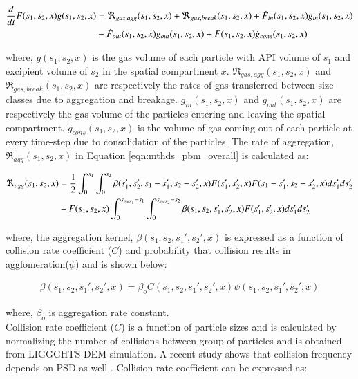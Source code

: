 \documentclass[preprint,11pt,authoryear]{elsarticle}
\begin{document}
\begin{align}
\frac{d}{dt}F(s_1,s_2,x)g(s_1,s_2,x)&= 
\Re_{gas,agg}(s_1,s_2,x)+\Re_{gas,break}(s_1,s_2,x)+\dot{F}_{in}(s_1,s_2,x)g_{in}(s_1,s_2,x)\notag\\
&-\dot{F}_{out}(s_1,s_2,x)g_{out}(s_1,s_2,x)+F(s_1,s_2,x)\dot{g}_{cons}(s_1,s_2,x)
\label{eqn:mthds_pbm_gas_agg} 
\end{align}

where, $g(s_1,s_2,x)$ is the gas volume of each particle with API volume of $s_1$ and excipient 
volume of $s_2$ in the spatial compartment $x$. $\Re_{gas,agg}(s_1,s_2,x)$ and 
$\Re_{gas,break}(s_1,s_2,x)$ are respectively the rates of gas transferred between size classes due to 
aggregation and breakage. $g_{in}(s_1,s_2,x)$ and $g_{out}(s_1,s_2,x)$ are respectively the gas 
volume of the particles entering and leaving the spatial compartment. $\dot{g}_{cons}(s_1,s_2,x)$ is the 
volume of gas coming out of each particle at every time-step due to consolidation of the particles. 
The rate of aggregation, $\Re_{agg}(s_1,s_2,x)$ in Equation \ref{eqn:mthds_pbm_overall} is 
calculated as: \citep{Chaturbedi2017}

\begin{align}
\Re_{agg}(s_1,s_2,x)&= \frac{1}{2}\int _0^{s_1} \int_0^{s_2} 
\beta(s_1',s_2',s_1-s_1',s_2-s_2',x)F(s_1',s_2',x)F(s_1-s_1',s_2-s_2',x)ds_1'ds_2'\notag\\ 
&- F(s_1,s_2,x)\int _0^{s_{max_1}-s_1} \int_0^{s_{max_2}-s_2} 
\beta(s_1,s_2,s_1',s_2',x)F(s_1',s_2',x)ds_1'ds_2'
\end{align}


where, the aggregation kernel, $\beta(s_1,s_2, s_1',s_2',x)$ is expressed as a function of collision 
rate coefficient ($C$) and probability that collision results in agglomeration($\psi$) \citep{ingram2005}
and is shown below: 

\begin{align}
\beta(s_1,s_2,s_1',s_2',x) = \beta_oC(s_1,s_2,s_1',s_2',x)\psi(s_1,s_2,s_1',s_2',x)
\label{eqn:mthds_pbm_beta_kernal}
\end{align}

where, $\beta_o$ is aggregation rate constant.\\
Collision rate coefficient ($C$) is a function of particle sizes and is calculated by normalizing the 
number of collisions between group of particles \citep{gantt2006} and is obtained from LIGGGHTS 
DEM simulation. A recent study shows that collision frequency depends on PSD as well 
\citep{sen2014}. Collision rate coefficient can be expressed as:
\end{document}
